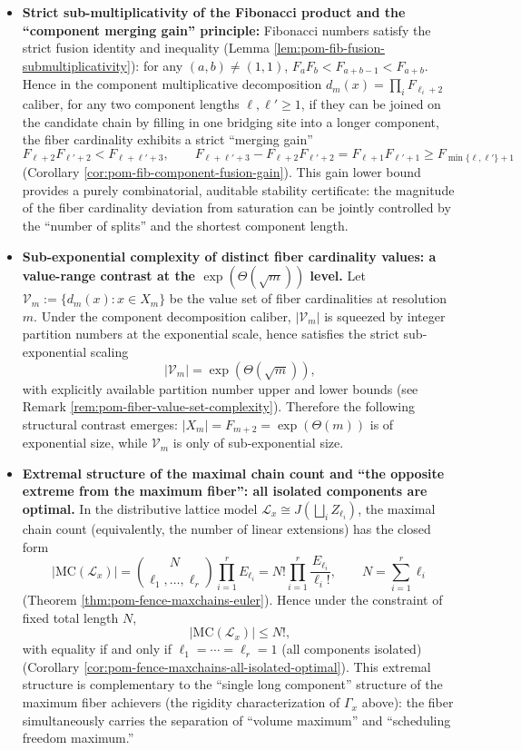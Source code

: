 \begin{enumerate}
\begin{itemize}
    \item \textbf{Strict sub-multiplicativity of the Fibonacci product and the ``component merging gain'' principle:}
    Fibonacci numbers satisfy the strict fusion identity and inequality (Lemma \ref{lem:pom-fib-fusion-submultiplicativity}): for any \((a,b)\neq(1,1)\),
    \(
    F_aF_b< F_{a+b-1}<F_{a+b}
    \).
    Hence in the component multiplicative decomposition \(d_m(x)=\prod_i F_{\ell_i+2}\) caliber, for any two component lengths \(\ell,\ell'\ge 1\), if they can be joined on the candidate chain by filling in one bridging site into a longer component, the fiber cardinality exhibits a strict ``merging gain''
    \[
    F_{\ell+2}F_{\ell'+2}<F_{\ell+\ell'+3},\qquad
    F_{\ell+\ell'+3}-F_{\ell+2}F_{\ell'+2}=F_{\ell+1}F_{\ell'+1}\ge F_{\min\{\ell,\ell'\}+1}
    \]
    (Corollary \ref{cor:pom-fib-component-fusion-gain}).
    This gain lower bound provides a purely combinatorial, auditable stability certificate: the magnitude of the fiber cardinality deviation from saturation can be jointly controlled by the ``number of splits'' and the shortest component length.

    \item \textbf{Sub-exponential complexity of distinct fiber cardinality values: a value-range contrast at the \texorpdfstring{\(\exp(\Theta(\sqrt m))\)}{exp(Theta(sqrt m))} level.}
    Let \(\mathcal{V}_m:=\{d_m(x):x\in X_m\}\) be the value set of fiber cardinalities at resolution \(m\).
    Under the component decomposition caliber, \(|\mathcal{V}_m|\) is squeezed by integer partition numbers at the exponential scale, hence satisfies the strict sub-exponential scaling
    \[
    |\mathcal{V}_m|=\exp(\Theta(\sqrt m)),
    \]
    with explicitly available partition number upper and lower bounds (see Remark \ref{rem:pom-fiber-value-set-complexity}).
    Therefore the following structural contrast emerges: \(|X_m|=F_{m+2}=\exp(\Theta(m))\) is of exponential size, while \(\mathcal{V}_m\) is only of sub-exponential size.

    \item \textbf{Extremal structure of the maximal chain count and ``the opposite extreme from the maximum fiber'': all isolated components are optimal.}
    In the distributive lattice model \(\mathcal L_x\cong J(\bigsqcup_i Z_{\ell_i})\), the maximal chain count (equivalently, the number of linear extensions) has the closed form
    \[
    |\mathrm{MC}(\mathcal L_x)|
    =\binom{N}{\ell_1,\dots,\ell_r}\prod_{i=1}^r E_{\ell_i}
    =N!\prod_{i=1}^r\frac{E_{\ell_i}}{\ell_i!},
    \qquad N=\sum_{i=1}^r \ell_i
    \]
    (Theorem \ref{thm:pom-fence-maxchains-euler}).
    Hence under the constraint of fixed total length \(N\),
    \[
    |\mathrm{MC}(\mathcal L_x)|\le N!,
    \]
    with equality if and only if \(\ell_1=\cdots=\ell_r=1\) (all components isolated) (Corollary \ref{cor:pom-fence-maxchains-all-isolated-optimal}).
    This extremal structure is complementary to the ``single long component'' structure of the maximum fiber achievers (the rigidity characterization of \(\Gamma_x\) above): the fiber simultaneously carries the separation of ``volume maximum'' and ``scheduling freedom maximum.''


\end{itemize}
\end{enumerate}

